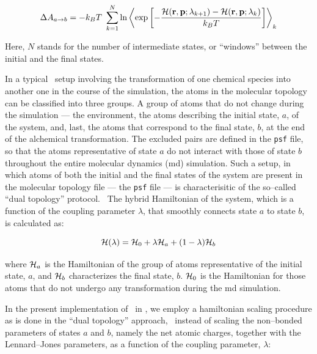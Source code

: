 \begin{equation}
\Delta A_{a \rightarrow b} = -k_B T \ \sum_{k = 1}^N \ln
\left< \exp\left[-\frac{{\cal H}({\bf r}, {\bf p}; \lambda_{k+1}) - 
                         {\cal H}({\bf r}, {\bf p}; \lambda_k)}
                        {k_B T}\right]
\right>_k
\end{equation}

Here, $N$ stands for the number of intermediate states, or ``windows''
between the initial and the final states.


In a typical \FEP\ setup involving the transformation
of one chemical species into another one in the course 
of the simulation, the atoms in the molecular topology can be 
classified into three groups. A group of atoms that do not change 
during the simulation --- \eg the environment,  
the atoms describing the initial state, $a$, of the system, and, last, the 
atoms that correspond to the final state, $b$, at the end of the 
alchemical transformation. 
The excluded pairs are defined in the {\tt psf} file, so that 
the atoms representative of state $a$
do not interact with those of state $b$ throughout the 
entire molecular dynamics ({\sc md}) simulation. 
Such a setup, in which atoms of both the initial and the
final states of the system are present in the molecular topology file --- \ie 
the {\tt psf} file --- is characterisitic of the so--called ``dual topology'' 
protocol.~\cite{Axelsen.98}
The hybrid Hamiltonian of the system, which is a function of the
coupling parameter $\lambda$, that smoothly connects state $a$
to state $b$, is calculated as:

\begin{equation}
{\cal H}(\lambda) = {\cal H}_0 + \lambda {\cal H}_a + (1-\lambda) {\cal H}_b
\end{equation}

where ${\cal H}_a$ is the Hamiltonian of the group of atoms representative
of the initial state, $a$, and ${\cal H}_b$ characterizes the final state,
$b$. 
${\cal H}_0$ is the Hamiltonian for those atoms that do not undergo any 
transformation during the {\sc md} simulation.


In the present implementation of \FEP\ in \NAMD, we employ a hamiltonian
scaling procedure as is done in the ``dual topology''
approach,~\cite{Pearlman.93} \ie instead 
of scaling the non--bonded parameters of states $a$ and $b$, 
namely the net atomic charges, together with the Lennard--Jones parameters, 
as a function of the coupling parameter, $\lambda$:

